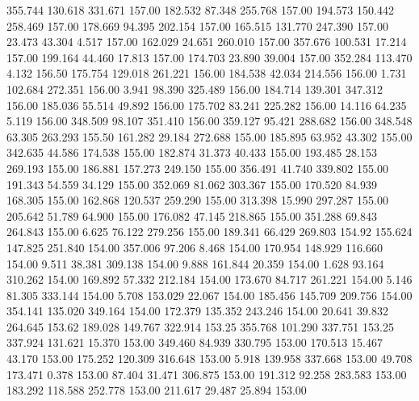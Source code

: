  355.744  130.618  331.671       157.00
 182.532   87.348  255.768       157.00
 194.573  150.442  258.469       157.00
 178.669   94.395  202.154       157.00
 165.515  131.770  247.390       157.00
  23.473   43.304    4.517       157.00
 162.029   24.651  260.010       157.00
 357.676  100.531   17.214       157.00
 199.164   44.460   17.813       157.00
 174.703   23.890   39.004       157.00
 352.284  113.470    4.132       156.50
 175.754  129.018  261.221       156.00
 184.538   42.034  214.556       156.00
   1.731  102.684  272.351       156.00
   3.941   98.390  325.489       156.00
 184.714  139.301  347.312       156.00
 185.036   55.514   49.892       156.00
 175.702   83.241  225.282       156.00
  14.116   64.235    5.119       156.00
 348.509   98.107  351.410       156.00
 359.127   95.421  288.682       156.00
 348.548   63.305  263.293       155.50
 161.282   29.184  272.688       155.00
 185.895   63.952   43.302       155.00
 342.635   44.586  174.538       155.00
 182.874   31.373   40.433       155.00
 193.485   28.153  269.193       155.00
 186.881  157.273  249.150       155.00
 356.491   41.740  339.802       155.00
 191.343   54.559   34.129       155.00
 352.069   81.062  303.367       155.00
 170.520   84.939  168.305       155.00
 162.868  120.537  259.290       155.00
 313.398   15.990  297.287       155.00
 205.642   51.789   64.900       155.00
 176.082   47.145  218.865       155.00
 351.288   69.843  264.843       155.00
   6.625   76.122  279.256       155.00
 189.341   66.429  269.803       154.92
 155.624  147.825  251.840       154.00
 357.006   97.206    8.468       154.00
 170.954  148.929  116.660       154.00
   9.511   38.381  309.138       154.00
   9.888  161.844   20.359       154.00
   1.628   93.164  310.262       154.00
 169.892   57.332  212.184       154.00
 173.670   84.717  261.221       154.00
   5.146   81.305  333.144       154.00
   5.708  153.029   22.067       154.00
 185.456  145.709  209.756       154.00
 354.141  135.020  349.164       154.00
 172.379  135.352  243.246       154.00
  20.641   39.832  264.645       153.62
 189.028  149.767  322.914       153.25
 355.768  101.290  337.751       153.25
 337.924  131.621   15.370       153.00
 349.460   84.939  330.795       153.00
 170.513   15.467   43.170       153.00
 175.252  120.309  316.648       153.00
   5.918  139.958  337.668       153.00
  49.708  173.471    0.378       153.00
  87.404   31.471  306.875       153.00
 191.312   92.258  283.583       153.00
 183.292  118.588  252.778       153.00
 211.617   29.487   25.894       153.00
